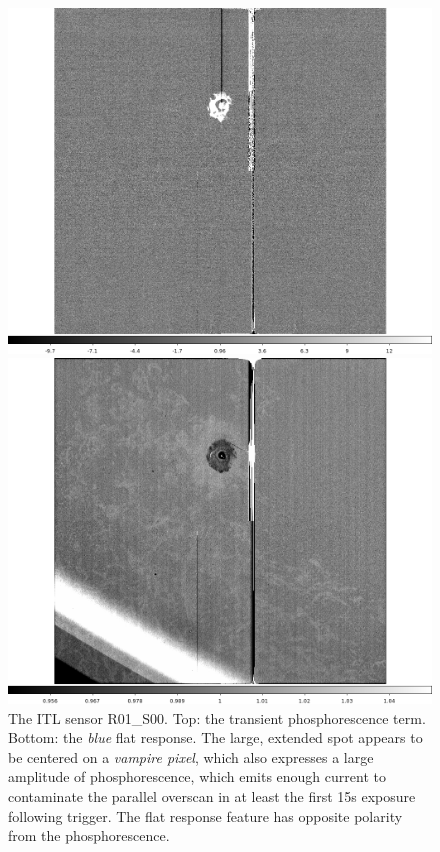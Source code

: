\begin{figure}[!htbp]
\centering
\begin{minipage}{1.0\textwidth}    
  \centering
  \includegraphics[width=.6\linewidth]{sections/figures/phosphorescence-survey/stains_phos_R01_S00.png}    
\end{minipage}
\begin{minipage}{1.0\textwidth}
  \centering
  \includegraphics[width=.6\linewidth]{sections/figures/phosphorescence-survey/stains_abs_R01_S00.png}
\end{minipage}
\caption{The ITL sensor R01\_S00. Top: the transient phosphorescence term. Bottom: the {\it blue} flat response. The large, extended spot appears to be centered on a {\it vampire pixel}, which also expresses a large amplitude of phosphorescence, which emits enough current to contaminate the parallel overscan in at least the first 15s exposure following trigger. The flat response feature has opposite polarity from the phosphorescence.}
\label{fig:phos:stains:R01S00}
\end{figure}


